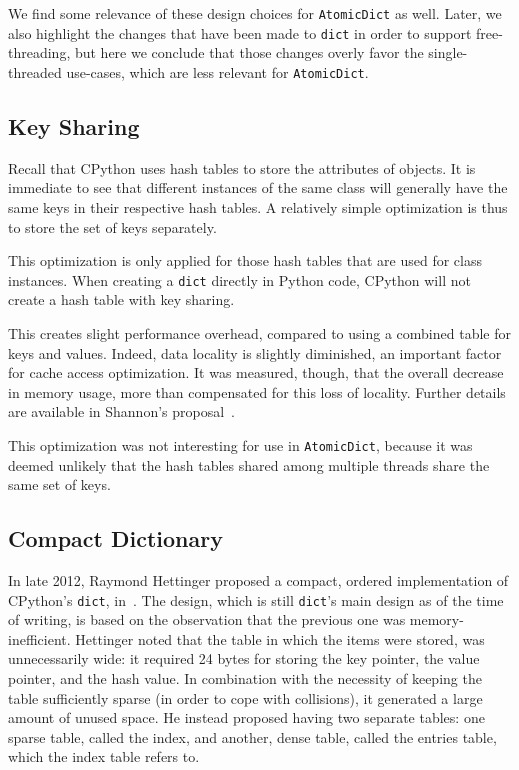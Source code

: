 We find some relevance of these design choices for \texttt{AtomicDict} as well.
Later, we also highlight the changes that have been made to \texttt{dict} in order to support free-threading, but here we conclude that those changes overly favor the single-threaded use-cases, which are less relevant for \texttt{AtomicDict}.


\subsection{Key Sharing}\label{subsec:key-sharing}

Recall that CPython uses hash tables to store the attributes of objects.
It is immediate to see that different instances of the same class will generally have the same keys in their respective hash tables.
A relatively simple optimization is thus to store the set of keys separately.

This optimization is only applied for those hash tables that are used for class instances.
When creating a \texttt{dict} directly in Python code, CPython will not create a hash table with key sharing.

This creates slight performance overhead, compared to using a combined table for keys and values.
Indeed, data locality is slightly diminished, an important factor for cache access optimization.
It was measured, though, that the overall decrease in memory usage, more than compensated for this loss of locality.
Further details are available in Shannon's proposal~\cite{pep412}.

This optimization was not interesting for use in \texttt{AtomicDict}, because it was deemed unlikely that the hash tables shared among multiple threads share the same set of keys.


\subsection{Compact Dictionary}\label{subsec:compact-dict}

In late 2012, Raymond Hettinger proposed a compact, ordered implementation of CPython's \texttt{dict}, in~\cite{hettinger-dict}.
The design, which is still \texttt{dict}'s main design as of the time of writing, is based on the observation that the previous one was memory-inefficient.
Hettinger noted that the table in which the items were stored, was unnecessarily wide: it required 24 bytes for storing the key pointer, the value pointer, and the hash value.
In combination with the necessity of keeping the table sufficiently sparse (in order to cope with collisions), it generated a large amount of unused space.
He instead proposed having two separate tables: one sparse table, called the index, and another, dense table, called the entries table, which the index table refers to.

